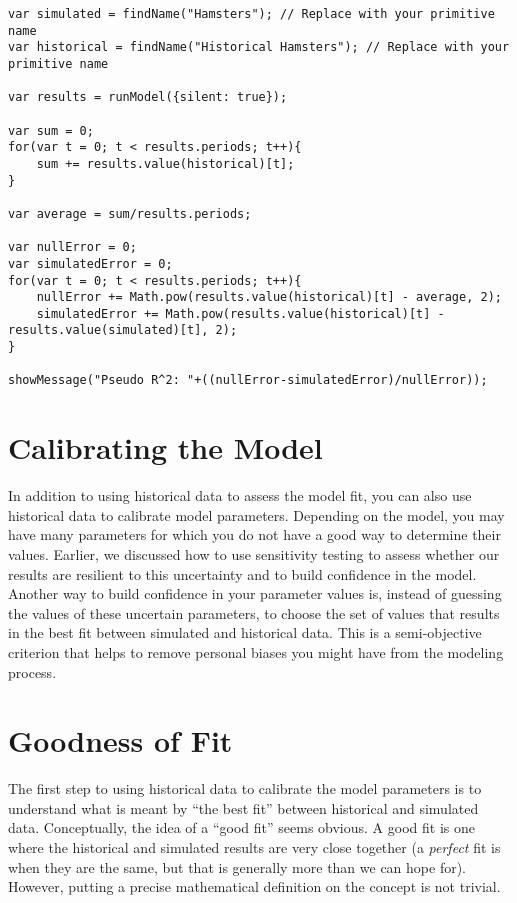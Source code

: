 \documentclass[]{memoir}
\begin{document}
\begin{lstlisting}
var simulated = findName("Hamsters"); // Replace with your primitive name
var historical = findName("Historical Hamsters"); // Replace with your primitive name

var results = runModel({silent: true});

var sum = 0;
for(var t = 0; t < results.periods; t++){
    sum += results.value(historical)[t];
}

var average = sum/results.periods;

var nullError = 0;
var simulatedError = 0;
for(var t = 0; t < results.periods; t++){
    nullError += Math.pow(results.value(historical)[t] - average, 2);
    simulatedError += Math.pow(results.value(historical)[t] - results.value(simulated)[t], 2);
}

showMessage("Pseudo R^2: "+((nullError-simulatedError)/nullError));
\end{lstlisting}

\section{Calibrating the Model}

In addition to using historical data to assess the model fit, you can
also use historical data to calibrate model parameters. Depending on the
model, you may have many parameters for which you do not have a good way
to determine their values. Earlier, we discussed how to use sensitivity
testing to assess whether our results are resilient to this uncertainty
and to build confidence in the model. Another way to build confidence in
your parameter values is, instead of guessing the values of these
uncertain parameters, to choose the set of values that results in the
best fit between simulated and historical data. This is a semi-objective
criterion that helps to remove personal biases you might have from the
modeling process.

\section{Goodness of Fit}

The first step to using historical data to calibrate the model
parameters is to understand what is meant by ``the best fit'' between
historical and simulated data. Conceptually, the idea of a ``good fit''
seems obvious. A good fit is one where the historical and simulated
results are very close together (a \emph{perfect} fit is when they are
the same, but that is generally more than we can hope for). However,
putting a precise mathematical definition on the concept is not trivial.
\end{document}
